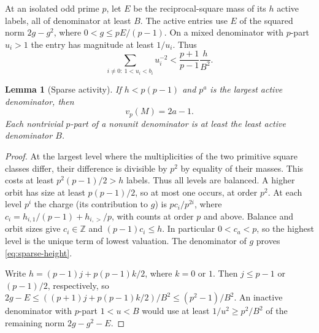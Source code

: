 \documentclass[11pt]{amsart}
\numberwithin{equation}{section}
\newtheorem{lemma}[theorem]{Lemma}
\theoremstyle{definition}
\theoremstyle{plain}
\newcommand{\ZZ}{\mathbb Z}
\begin{document}
At an isolated odd prime $p$, let $E$ be the reciprocal-square
mass of its $h$ active labels, all of denominator at least $B$. The
active entries use $E$ of the squared norm $2g-g^2$, where
$0<g\le pE/(p-1)$. On a mixed denominator with $p$-part $u_i>1$
the entry has magnitude at least $1/u_i$. Thus
\begin{equation}
 \sum_{i\ne0:\ 1<u_i<b_i}u_i^{-2}
       <\frac{p+1}{p-1}\frac{h}{B^2}.
\end{equation}

\begin{lemma}[Sparse activity]\label{result:activity-height-gap}
If $h<p(p-1)$ and $p^a$ is the largest active denominator, then
\begin{equation}\label{eq:sparse-height}v_p(M)=2a-1.\end{equation}
Each nontrivial $p$-part of a nonunit denominator is at least the
least active denominator $B$.
\end{lemma}
\begin{proof}
At the largest level where the multiplicities of the two primitive
square classes differ, their difference is divisible by $p^2$ by
equality of their masses. This costs at least $p^2(p-1)/2>h$ labels.
Thus all levels are balanced. A higher orbit has size at least
$p(p-1)/2$, so at most one occurs, at order $p^2$. At each level
$p^i$ the charge (its contribution to $g$) is $pc_i/p^{2i}$, where
$c_i=h_{i,1}/(p-1)+h_{i,>}/p$, with counts at order $p$ and above.
Balance and orbit sizes give $c_i\in\ZZ$ and $(p-1)c_i\le h$.
In particular $0<c_a<p$, so the highest level is the unique term
of lowest valuation. The denominator of $g$ proves \eqref{eq:sparse-height}.

Write $h=(p-1)j+p(p-1)k/2$, where $k=0$ or $1$. Then
$j\le p-1$ or $(p-1)/2$, respectively, so
$2g-E\le((p+1)j+p(p-1)k/2)/B^2\le(p^2-1)/B^2$.
An inactive denominator with $p$-part $1<u<B$ would use at least
$1/u^2\ge p^2/B^2$ of the remaining norm $2g-g^2-E$.
\end{proof}
\end{document}

